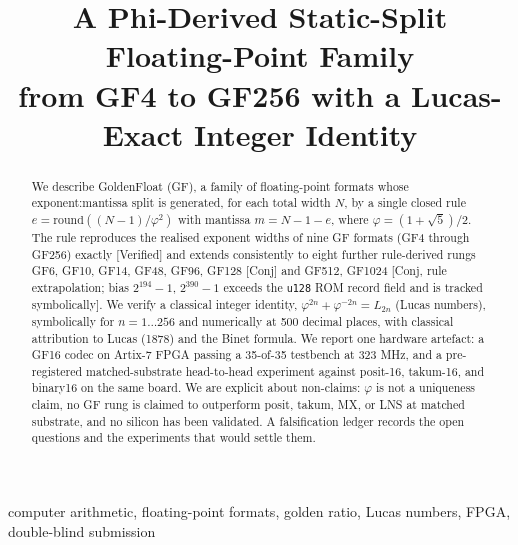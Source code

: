 \documentclass[conference]{IEEEtran}
\begin{document}
\title{A Phi-Derived Static-Split Floating-Point Family\\
       from GF4 to GF256 with a Lucas-Exact Integer Identity}

\author{
}

\maketitle

\begin{abstract}
We describe GoldenFloat (GF), a family of floating-point formats whose
exponent:mantissa split is generated, for each total width $N$, by a
single closed rule $e = \mathrm{round}((N-1)/\varphi^2)$ with mantissa
$m = N-1-e$, where $\varphi = (1+\sqrt{5})/2$. The rule reproduces the
realised exponent widths of nine GF formats (GF4 through GF256) exactly
[Verified] and extends consistently to eight further rule-derived rungs
GF6, GF10, GF14, GF48, GF96, GF128 [Conj] and GF512, GF1024
[Conj, rule extrapolation; bias $2^{194}-1$, $2^{390}-1$ exceeds the
\texttt{u128} ROM record field and is tracked symbolically]. We
verify a classical integer identity, $\varphi^{2n} + \varphi^{-2n} =
L_{2n}$ (Lucas numbers), symbolically for $n = 1\ldots 256$ and
numerically at 500 decimal places, with classical attribution to Lucas
(1878) and the Binet formula. We report one hardware artefact: a GF16
codec on Artix-7 FPGA passing a 35-of-35 testbench at 323 MHz, and a
pre-registered matched-substrate head-to-head experiment against
posit-16, takum-16, and binary16 on the same board. We are explicit
about non-claims: $\varphi$ is not a uniqueness claim, no GF rung is
claimed to outperform posit, takum, MX, or LNS at matched substrate, and
no silicon has been validated. A falsification ledger records the open
questions and the experiments that would settle them.
\end{abstract}

\begin{IEEEkeywords}
computer arithmetic, floating-point formats, golden ratio, Lucas
numbers, FPGA, double-blind submission
\end{IEEEkeywords}
\end{document}

